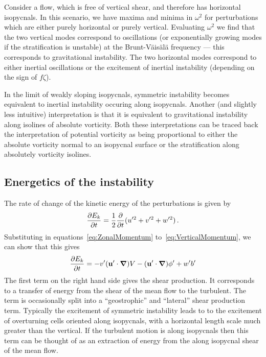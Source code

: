     Consider a flow, which is free of vertical shear, and therefore has horizontal isopycnals. In this scenario, we have maxima and minima in $\omega^2$ for perturbations which are either purely horizontal or purely vertical. Evaluating $\omega^2$ we find that the two vertical modes correspond to oscillations (or exponentially growing modes if the stratification is unstable) at the Brunt-V\"ais\"al\"a frequency --- this corresponds to gravitational instability. The two horizontal modes correspond to either inertial oscillations or the excitement of inertial instability (depending on the sign of $f \zeta$).

    In the limit of weakly sloping isopycnals, symmetric instability becomes equivalent to inertial instability occuring along isopycnals. Another (and slightly less intuitive) interpretation is that it is equivalent to gravitational instability along isolines of absolute vorticity. Both these interpretations can be traced back the interpretation of potential vorticity as being proportional to either the absolute vorticity normal to an isopycnal surface or the stratification along absolutely vorticity isolines.
    
    \subsection{Energetics of the instability}
    The rate of change of the kinetic energy of the perturbations is given by
    \begin{equation}
        \label{eq:TurbulentKE}
        \pdv{E_k}{t} = \frac{1}{2}\frac{\partial}{\partial t} (u'^2 + v'^2 + w'^2) \, .
    \end{equation}
    Substituting in equations~\ref{eq:ZonalMomentum} to~\ref{eq:VerticalMomentum}, we can show that this gives
    \begin{equation}
        \pdv{E_k}{t} = - v' (\mathbf{u}'\cdot \grad) V - (\mathbf{u}'\cdot \grad) \phi ' + w' b' 
    \end{equation}
    The first term on the right hand side gives the shear production. It corresponds to a transfer of energy from the shear of the mean flow to the turbulent. The term is occasionally split into a ``geostrophic'' and ``lateral'' shear production term. Typically the excitement of symmetric instability leads to to the excitement of overturning cells oriented along isopycnals, with a horizontal length scale much greater than the vertical. If the turbulent motion is along isopycnals then this term can be thought of as an extraction of energy from the along isopycnal shear of the mean flow.
    
